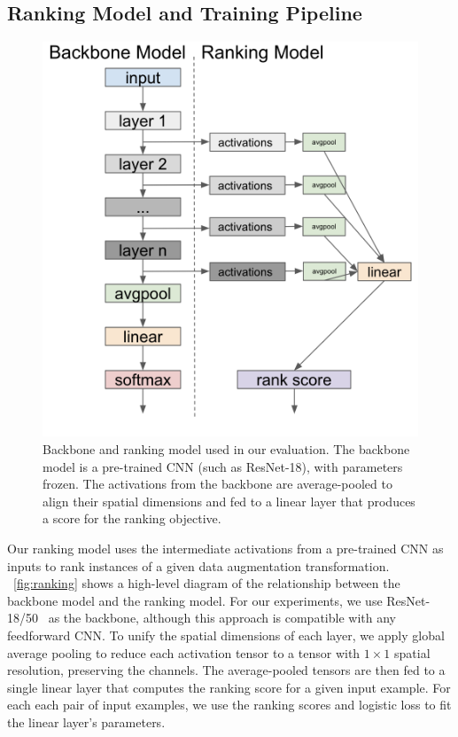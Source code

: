 \subsection{Ranking Model and Training Pipeline}
\begin{figure}[t]
\includegraphics[width=\textwidth]{diagrams/ranking.png}
\caption{Backbone and ranking model used in our evaluation. The backbone model is a pre-trained CNN (such as ResNet-18), with parameters frozen. The activations from the backbone are average-pooled to align their spatial dimensions and fed to a linear layer that produces a score for the ranking objective.}
\label{fig:ranking}
\end{figure}

Our ranking model uses the intermediate activations from a pre-trained CNN as inputs to rank instances of a given data augmentation transformation.
~\autoref{fig:ranking} shows a high-level diagram of the relationship between the backbone model and the ranking model.
For our experiments, we use ResNet-18/50~\cite{he2016deep} as the backbone, although this approach is compatible with any feedforward CNN.
To unify the spatial dimensions of each layer, we apply global average pooling to reduce each activation tensor to a tensor with $1\times 1$ spatial resolution, preserving the channels.
The average-pooled tensors are then fed to a single linear layer that computes the ranking score for a given input example.
For each each pair of input examples, we use the ranking scores and logistic loss to fit the linear layer's parameters.



